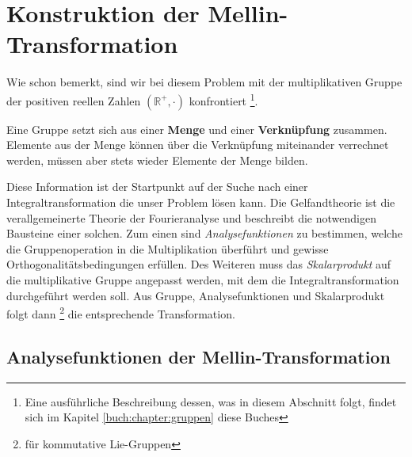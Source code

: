 %
%
%

\section{Konstruktion der Mellin-Transformation
\label{mellin:section:teil2}}
Wie schon bemerkt, sind wir bei diesem Problem mit der multiplikativen 
Gruppe der positiven reellen Zahlen $(\mathbb{R^+},\cdot)$ konfrontiert 
\footnote{Eine ausführliche Beschreibung dessen, was in diesem Abschnitt 
folgt, findet sich im Kapitel \ref{buch:chapter:gruppen} diese Buches}.
\begin{definition}
    Eine Gruppe setzt sich aus einer \textbf{Menge} und einer 
    \textbf{Verknüpfung} zusammen. 
    Elemente aus der Menge können über die Verknüpfung miteinander 
    verrechnet werden, müssen aber stets wieder Elemente der Menge bilden.
\end{definition}
Diese Information ist der Startpunkt auf der Suche nach einer 
Integraltransformation die unser Problem lösen kann.
Die Gelfandtheorie ist die verallgemeinerte Theorie der Fourieranalyse und 
beschreibt die notwendigen Bausteine einer solchen.
Zum einen sind \emph{Analysefunktionen} zu bestimmen, welche die 
Gruppenoperation in die Multiplikation überführt und gewisse 
Orthogonalitätsbedingungen erfüllen. 
Des Weiteren muss das \emph{Skalarprodukt} auf die multiplikative Gruppe 
angepasst werden, mit dem die Integraltransformation durchgeführt werden 
soll.
Aus Gruppe, Analysefunktionen und Skalarprodukt folgt dann 
\footnote{für kommutative Lie-Gruppen} die entsprechende Transformation.






\subsection{Analysefunktionen der Mellin-Transformation
\label{mellin:subsection:analysefunktionen}}

